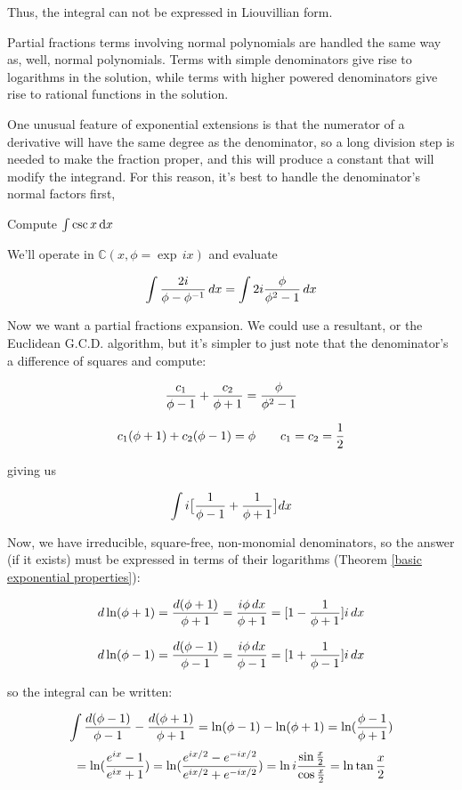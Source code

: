 Thus, the integral
can not be expressed in Liouvillian form.

\endexample

\vfil\eject

Partial fractions terms involving normal polynomials are handled the
same way as, well, normal polynomials.  Terms with simple denominators
give rise to logarithms in the solution, while terms with higher
powered denominators give rise to rational functions in the solution.

One unusual feature of exponential extensions is that the numerator of
a derivative will have the same degree as the denominator, so a long
division step is needed to make the fraction proper, and this will
produce a constant that will modify the integrand.  For this reason,
it's best to handle the denominator's normal factors first,


\example Compute $\int \csc x \, {\rm d}x$

We'll operate in ${\mathbb C}(x, \phi = \exp \,ix)$ and evaluate

$$\int {{2i}\over{\phi - \phi^{-1}}} \,dx = \int 2i {{\phi}\over{\phi^2 - 1}} \,dx$$

Now we want a partial fractions expansion.  We could use a resultant,
or the Euclidean G.C.D. algorithm, but it's simpler to just note that
the denominator's a difference of squares and compute:

$${{c_1}\over{\phi-1}} + {{c_2}\over{\phi+1}} = {{\phi}\over{\phi^2-1}} $$

$${{c_1}(\phi+1)} + {{c_2}(\phi-1)} = \phi \qquad c_1 = c_2 = {1\over2} $$

giving us

$$\int i \big[ {{1}\over{\phi-1}} + {{1}\over{\phi+1}} \big] dx$$

Now, we have irreducible, square-free, non-monomial denominators, so
the answer (if it exists) must be expressed in terms of their
logarithms (Theorem \ref{basic exponential properties}):

$$ d \ln(\phi+1) = {{d(\phi+1)}\over{\phi+1}} = {{i\phi\,dx}\over{\phi+1}} = [1 - {{1}\over{\phi+1}}]i\,dx$$

$$ d \ln(\phi-1) = {{d(\phi-1)}\over{\phi-1}} = {{i\phi\,dx}\over{\phi-1}} = [1 + {{1}\over{\phi-1}}]i\,dx$$

so the integral can be written:

$$\int {{d(\phi-1)}\over{\phi-1}} - {{d(\phi+1)}\over{\phi+1}} = \ln (\phi-1) - \ln(\phi+1) = \ln({{\phi-1}\over{\phi+1}})$$
$$ = \ln ({{e^{ix}-1}\over{e^{ix}+1}}) = \ln ({{e^{ix/2}-e^{-ix/2}}\over{e^{ix/2}+e^{-ix/2}}}) = \ln i {{\sin {x\over2}}\over{\cos {x\over2}}} = \ln \tan {x\over2} $$

